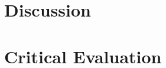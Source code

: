 \documentclass[11pt]{report}
\begin{document}
\chapter{Discussion}
\label{sec-5}

\chapter{Critical Evaluation}
\label{sec-6}

\clearpage


\end{document}
